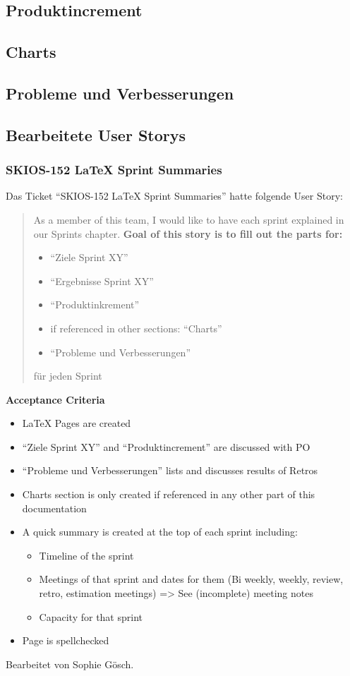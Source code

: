 \subsection{Produktincrement}
\subsection{Charts}

\subsection{Probleme und Verbesserungen}


\subsection{Bearbeitete User Storys}

\subsubsection{SKIOS-152 LaTeX Sprint Summaries}
Das Ticket \enquote{SKIOS-152 LaTeX Sprint Summaries} hatte folgende User Story:
\begin{quotation}
    As a member of this team, I would like to have each sprint explained in our Sprints chapter.
    \textbf{Goal of this story is to fill out the parts for:}
        \begin{itemize}
            \item “Ziele Sprint XY”
            \item “Ergebnisse Sprint XY”
            \item “Produktinkrement”
            \item if referenced in other sections: “Charts”
            \item “Probleme und Verbesserungen”
        \end{itemize}
        für jeden Sprint
\end{quotation}
\textbf{Acceptance Criteria}
    \begin{itemize}
        \item LaTeX Pages are created
        \item “Ziele Sprint XY” and “Produktincrement” are discussed with PO
        \item “Probleme und Verbesserungen” lists and discusses results of Retros
        \item Charts section is only created if referenced in any other part of this documentation
        \item A quick summary is created at the top of each sprint including:
        \begin{itemize}
            \item Timeline of the sprint
            \item Meetings of that sprint and dates for them (Bi weekly, weekly, review, retro, estimation meetings) => See (incomplete) meeting notes
            \item Capacity for that sprint
        \end{itemize}
        \item Page is spellchecked
    \end{itemize}
Bearbeitet von Sophie Gösch.